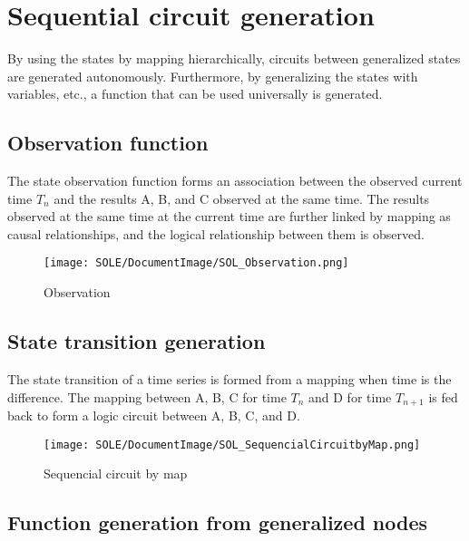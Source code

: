 \documentclass[12pt]{article}
\begin{document}
\clearpage

\section{Sequential circuit generation}\label{sequential-circuit-generation}

By using the states by mapping hierarchically, circuits between
generalized states are generated autonomously. Furthermore, by
generalizing the states with variables, etc., a function that can be
used universally is generated.

\subsection{Observation function}\label{observation-function}

The state observation function forms an association between the observed
current time \(T_n\) and the results A, B, and C observed at the same
time. The results observed at the same time at the current time are
further linked by mapping as causal relationships, and the logical
relationship between them is observed.

\begin{figure}[ht]
  \centering
  \texttt{[image: SOLE/DocumentImage/SOL\_Observation.png]}
  \caption{Observation}
  \label{fig:observation}
\end{figure}

\subsection{State transition
generation}\label{state-transition-generation}

The state transition of a time series is formed from a mapping when time
is the difference. The mapping between A, B, C for time \(T_n\) and D
for time \(T_{n+1}\) is fed back to form a logic circuit between A, B,
C, and D.

\begin{figure}[ht]
  \centering
  \texttt{[image: SOLE/DocumentImage/SOL\_SequencialCircuitbyMap.png]}
  \caption{Sequencial circuit by map}
  \label{fig:sequencial_circuit_by_map}
\end{figure}

\subsection{Function generation from generalized
nodes}\label{function-generation-from-generalized-nodes}
\end{document}
